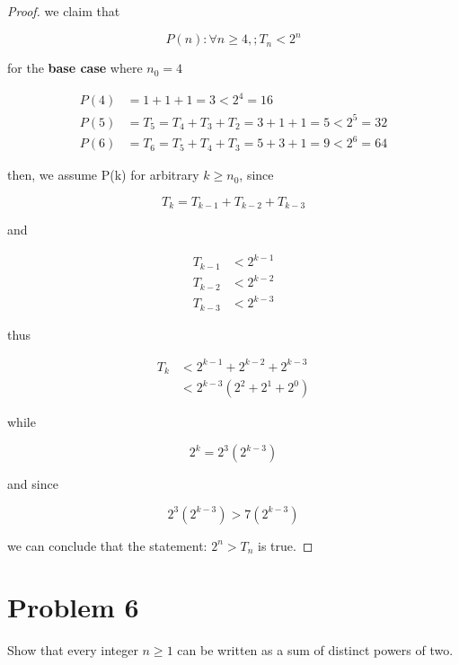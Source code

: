 \medskip
\solution
\begin{proof}
    
we claim that

\[
P(n) : \forall n \ge 4, ; T_n < 2^n
\]

for the \textbf{base case} where $n_0 = 4$

\[
\begin{aligned}
P(4) &= 1 + 1 + 1 = 3 < 2^4 = 16 \\
P(5) &= T_5 = T_4 + T_3 + T_2 = 3 + 1 + 1 = 5 < 2^5 = 32 \\
P(6) &= T_6 = T_5 + T_4 + T_3 = 5 + 3 + 1 = 9 < 2^6 = 64
\end{aligned}
\]

then, we assume P(k) for arbitrary $k \ge n_0$, since

\[
T_k = T_{k-1} + T_{k-2} + T_{k-3}
\]

and

\[
\begin{aligned}
T_{k-1} &< 2^{k-1} \\
T_{k-2} &< 2^{k-2} \\
T_{k-3} &< 2^{k-3}
\end{aligned}
\]

thus

\[
\begin{aligned}
T_k &< 2^{k-1} + 2^{k-2} + 2^{k-3} \\
&< 2^{k-3}(2^2 + 2^1 + 2^0)
\end{aligned}
\]

while

\[
2^k = 2^3 (2^{k-3})
\]

and since

\[
2^3 (2^{k-3}) > 7 (2^{k-3})
\]

we can conclude that the statement: $2^n > T_n$ is true.
\end{proof}
\vspace{1em}
\hrulefill

\section*{Problem 6}
Show that every integer $n \ge 1$ can be written as a sum of distinct powers of two.

\medskip
\solution

